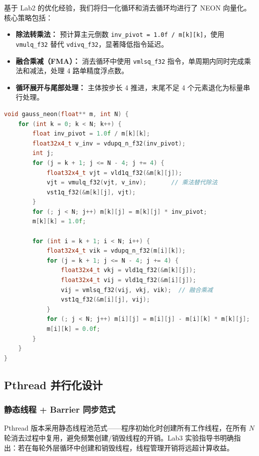 \documentclass[a4paper]{article}
\begin{document}
基于 Lab2 的优化经验，我们将归一化循环和消去循环均进行了 NEON 向量化。核心策略包括：
\begin{itemize}
    \item \textbf{除法转乘法：} 预计算主元倒数 \texttt{inv\_pivot = 1.0f / m[k][k]}，使用 \texttt{vmulq\_f32} 替代 \texttt{vdivq\_f32}，显著降低指令延迟。
    \item \textbf{融合乘减（FMA）：} 消去循环中使用 \texttt{vmlsq\_f32} 指令，单周期内同时完成乘法和减法，处理 4 路单精度浮点数。
    \item \textbf{循环展开与尾部处理：} 主体按步长 4 推进，末尾不足 4 个元素退化为标量串行处理。
\end{itemize}

\begin{lstlisting}[title=NEON 向量化高斯消去,frame=trbl,language={C++}]
void gauss_neon(float** m, int N) {
    for (int k = 0; k < N; k++) {
        float inv_pivot = 1.0f / m[k][k];
        float32x4_t v_inv = vdupq_n_f32(inv_pivot);
        int j;
        for (j = k + 1; j <= N - 4; j += 4) {
            float32x4_t vjt = vld1q_f32(&m[k][j]);
            vjt = vmulq_f32(vjt, v_inv);       // 乘法替代除法
            vst1q_f32(&m[k][j], vjt);
        }
        for (; j < N; j++) m[k][j] = m[k][j] * inv_pivot;
        m[k][k] = 1.0f;

        for (int i = k + 1; i < N; i++) {
            float32x4_t vik = vdupq_n_f32(m[i][k]);
            for (j = k + 1; j <= N - 4; j += 4) {
                float32x4_t vkj = vld1q_f32(&m[k][j]);
                float32x4_t vij = vld1q_f32(&m[i][j]);
                vij = vmlsq_f32(vij, vkj, vik);  // 融合乘减
                vst1q_f32(&m[i][j], vij);
            }
            for (; j < N; j++) m[i][j] = m[i][j] - m[i][k] * m[k][j];
            m[i][k] = 0.0f;
        }
    }
}
\end{lstlisting}

\subsection{Pthread 并行化设计}

\subsubsection{静态线程 + Barrier 同步范式}

Pthread 版本采用静态线程池范式——程序初始化时创建所有工作线程，在所有 $N$ 轮消去过程中复用，避免频繁创建/销毁线程的开销。Lab3 实验指导书明确指出：若在每轮外层循环中创建和销毁线程，线程管理开销将远超计算收益。
\end{document}
